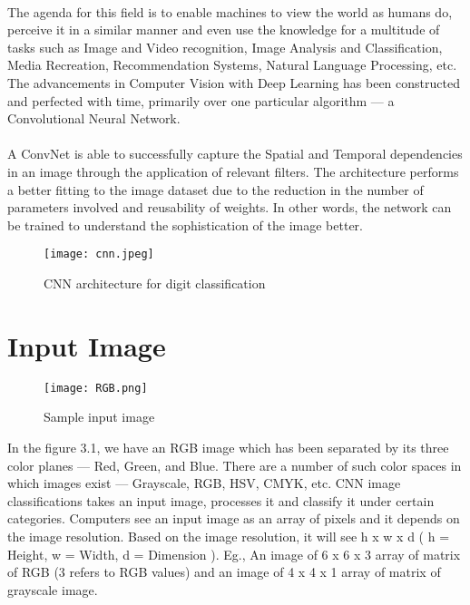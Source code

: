 \documentclass[a4paper,12pt]{report}
\begin{document}
\paragraph{}
The agenda for this field is to enable machines to view the world as humans do, perceive it in a similar manner and even use the knowledge for a multitude of tasks such as Image and Video recognition, Image Analysis and Classification, Media Recreation, Recommendation Systems, Natural Language Processing, etc. The advancements in Computer Vision with Deep Learning has been constructed and perfected with time, primarily over one particular algorithm — a Convolutional Neural Network.

\paragraph{}
A ConvNet is able to successfully capture the Spatial and Temporal dependencies in an image through the application of relevant filters. The architecture performs a better fitting to the image dataset due to the reduction in the number of parameters involved and reusability of weights. In other words, the network can be trained to understand the sophistication of the image better.

\vspace*{0.3cm}
\begin{figure}[!h]
	\begin{center}
		\texttt{[image: cnn.jpeg]}    
		\caption{CNN architecture for digit classification}
		\label{fig1}
	\end{center}
\end{figure}

\section{Input Image}

\vspace*{0.5cm}
\begin{figure}[!h]
	\begin{center}
		\texttt{[image: RGB.png]}    
		\caption{Sample input image}
		\label{fig1}
	\end{center}
\end{figure}
\vspace*{0.5cm}

In the figure 3.1, we have an RGB image which has been separated by its three color planes — Red, Green, and Blue. There are a number of such color spaces in which images exist — Grayscale, RGB, HSV, CMYK, etc.
CNN image classifications takes an input image, processes it and classify it under certain categories. Computers see an input image as an array of pixels and it depends on the image resolution. Based on the image resolution, it will see h x w x d ( h = Height, w = Width, d = Dimension ). Eg., An image of 6 x 6 x 3 array of matrix of RGB (3 refers to RGB values) and an image of 4 x 4 x 1 array of matrix of grayscale image.
\end{document}
